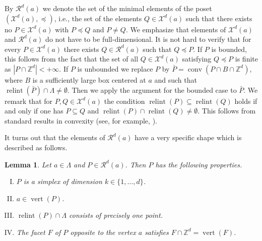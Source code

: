 \documentclass[a4paper]{article}
\theoremstyle{plain}
\newtheorem{lemma}[nn]{Lemma}
\begin{document}
By ${\mathcal{R}}^d(a)$ we denote the set of the minimal elements of
the poset $({\mathcal{X}}^d(a),\preceq)$, i.e., the set of the
elements $Q \in {\mathcal{X}}^d(a)$ such that there exists no $P \in
{\mathcal{X}}^d(a)$ with  $P \preceq Q$ and $P \ne Q$.
We emphasize that elements of ${\mathcal{X}}^d(a)$ and ${\mathcal{R}}^d(a)$ do
not have to be full-dimensional.
It is not hard to verify that for every $P \in {\mathcal{X}}^d(a)$
there exists $Q \in {\mathcal{R}}^d(a)$ such that $Q \preceq P$.
If $P$ is bounded, this follows from the fact that the set
of all $Q \in {\mathcal{X}}^d(a)$ satisfying $Q \preceq P$ is finite
as ${\left|{P \cap {\mathbb{Z}}^d}\right|} < +\infty$.
If $P$ is unbounded we replace $P$ by $\bar{P} = {{\mathop{\mathrm{{conv}}}}}(P
\cap B \cap {\mathbb{Z}}^d)$, where $B$ is a sufficiently large
box centered at $a$ and such that ${{\mathop{\mathrm{{relint}}}}}(\bar{P}) \cap
\Lambda \ne \emptyset$.
Then we apply the argument for the bounded case to
$\bar{P}$.
We remark that for $P, Q \in {\mathcal{X}}^d(a)$ the condition
${{\mathop{\mathrm{{relint}}}}}(P) \subseteq {{\mathop{\mathrm{{relint}}}}}(Q)$ holds if and only if one
has $P \subseteq Q$ and ${{\mathop{\mathrm{{relint}}}}}(P) \cap {{\mathop{\mathrm{{relint}}}}}(Q) \ne
\emptyset$.
This follows from standard results in convexity (see, for
example, \cite[Theorem\,6.5]{Rockafellar72}).

It turns out that the elements of ${\mathcal{R}}^d(a)$ have a very
specific shape which is described as follows.

\begin{lemma} \label{properties of tight}
Let $a \in \Lambda$ and $P \in {\mathcal{R}}^d(a)$.
Then $P$ has the following properties.
  \begin{enumerate}[I.]
    \item \label{a-red is simplex} $P$ is a simplex of
      dimension $k \in \{1,\ldots,d\}$.
    \item \label{a-red a is vertex} $a \in {{\mathop{\mathrm{{vert}}}}}(P)$.
    \item \label{a-red only one int}${{\mathop{\mathrm{{relint}}}}}(P) \cap
      \Lambda$ consists of precisely one point.
    \item \label{a-red opp is empty} The facet $F$ of $P$
      opposite to the vertex $a$ satisfies $F \cap
      {\mathbb{Z}}^d = {{\mathop{\mathrm{{vert}}}}}(F)$.
  \end{enumerate}
\end{lemma}
\end{document}
